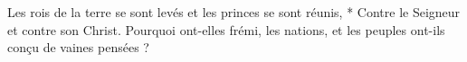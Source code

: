 Les rois de la terre se sont levés et les princes se sont réunis,
* Contre le Seigneur et contre son Christ.
\versseparator
Pourquoi ont-elles frémi, les nations, et les peuples ont-ils conçu de vaines pensées ?